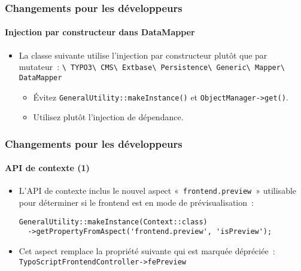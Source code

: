 \begin{frame}[fragile]
	\frametitle{Changements pour les développeurs}
	\framesubtitle{Injection par constructeur dans DataMapper}

	\begin{itemize}

		\item La classe suivante utilise l'injection par constructeur plutôt que par mutateur~:
			\smaller
				\texttt{\textbackslash
					TYPO3\textbackslash
					CMS\textbackslash
					Extbase\textbackslash
					Persistence\textbackslash
					Generic\textbackslash
					Mapper\textbackslash
					DataMapper}
			\normalsize

			\begin{itemize}\smaller
				\item[\ding{228}] Évitez \texttt{GeneralUtility::makeInstance()} et \texttt{ObjectManager->get()}.
				\item[\ding{228}] Utilisez plutôt l'injection de dépendance.
			\end{itemize}\normalsize

	\end{itemize}

\end{frame}


\begin{frame}[fragile]
	\frametitle{Changements pour les développeurs}
	\framesubtitle{API de contexte (1)}

	\lstset{basicstyle=\tiny\ttfamily}

	\begin{itemize}

		\item L'API de contexte inclus le nouvel aspect «~\texttt{frontend.preview}~»
			utilisable pour déterminer si le frontend est en mode de prévisualisation~:

\begin{lstlisting}
GeneralUtility::makeInstance(Context::class)
  ->getPropertyFromAspect('frontend.preview', 'isPreview');
\end{lstlisting}

		\item Cet aspect remplace la propriété suivante qui est marquée dépréciée~:
			\small\texttt{TypoScriptFrontendController->fePreview}\normalsize

	\end{itemize}

\end{frame}

